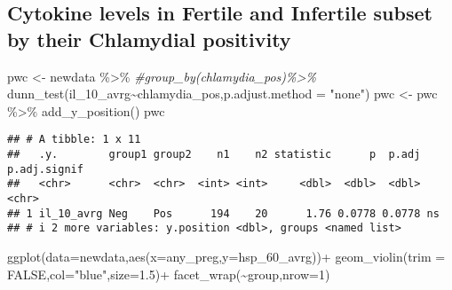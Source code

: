 \documentclass[
]{article}
\newenvironment{Shaded}{\begin{snugshade}}{\end{snugshade}}
\newcommand{\AttributeTok}[1]{\textcolor[rgb]{0.77,0.63,0.00}{#1}}
\newcommand{\CommentTok}[1]{\textcolor[rgb]{0.56,0.35,0.01}{\textit{#1}}}
\newcommand{\ConstantTok}[1]{\textcolor[rgb]{0.00,0.00,0.00}{#1}}
\newcommand{\DecValTok}[1]{\textcolor[rgb]{0.00,0.00,0.81}{#1}}
\newcommand{\FloatTok}[1]{\textcolor[rgb]{0.00,0.00,0.81}{#1}}
\newcommand{\FunctionTok}[1]{\textcolor[rgb]{0.00,0.00,0.00}{#1}}
\newcommand{\NormalTok}[1]{#1}
\newcommand{\OtherTok}[1]{\textcolor[rgb]{0.56,0.35,0.01}{#1}}
\newcommand{\SpecialCharTok}[1]{\textcolor[rgb]{0.00,0.00,0.00}{#1}}
\newcommand{\StringTok}[1]{\textcolor[rgb]{0.31,0.60,0.02}{#1}}
\begin{document}
\hypertarget{cytokine-levels-in-fertile-and-infertile-subset-by-their-chlamydial-positivity}{%
\subsection{\texorpdfstring{\textbf{Cytokine levels in Fertile and
Infertile subset by their Chlamydial
positivity}}{Cytokine levels in Fertile and Infertile subset by their Chlamydial positivity}}\label{cytokine-levels-in-fertile-and-infertile-subset-by-their-chlamydial-positivity}}

\begin{Shaded}
\begin{Highlighting}[]
\NormalTok{pwc }\OtherTok{\textless{}{-}}\NormalTok{ newdata }\SpecialCharTok{\%\textgreater{}\%}
  \CommentTok{\#group\_by(chlamydia\_pos)\%\textgreater{}\%}
  \FunctionTok{dunn\_test}\NormalTok{(il\_10\_avrg}\SpecialCharTok{\textasciitilde{}}\NormalTok{chlamydia\_pos,}\AttributeTok{p.adjust.method =} \StringTok{"none"}\NormalTok{)}
\NormalTok{pwc }\OtherTok{\textless{}{-}}\NormalTok{ pwc }\SpecialCharTok{\%\textgreater{}\%} \FunctionTok{add\_y\_position}\NormalTok{()}
\NormalTok{pwc}
\end{Highlighting}
\end{Shaded}

\begin{verbatim}
## # A tibble: 1 x 11
##   .y.        group1 group2    n1    n2 statistic      p  p.adj p.adj.signif
##   <chr>      <chr>  <chr>  <int> <int>     <dbl>  <dbl>  <dbl> <chr>       
## 1 il_10_avrg Neg    Pos      194    20      1.76 0.0778 0.0778 ns          
## # i 2 more variables: y.position <dbl>, groups <named list>
\end{verbatim}

\begin{Shaded}
\begin{Highlighting}[]
\FunctionTok{ggplot}\NormalTok{(}\AttributeTok{data=}\NormalTok{newdata,}\FunctionTok{aes}\NormalTok{(}\AttributeTok{x=}\NormalTok{any\_preg,}\AttributeTok{y=}\NormalTok{hsp\_60\_avrg))}\SpecialCharTok{+}
  \FunctionTok{geom\_violin}\NormalTok{(}\AttributeTok{trim =} \ConstantTok{FALSE}\NormalTok{,}\AttributeTok{col=}\StringTok{"blue"}\NormalTok{,}\AttributeTok{size=}\FloatTok{1.5}\NormalTok{)}\SpecialCharTok{+}
  \FunctionTok{facet\_wrap}\NormalTok{(}\SpecialCharTok{\textasciitilde{}}\NormalTok{group,}\AttributeTok{nrow=}\DecValTok{1}\NormalTok{)}
\end{Highlighting}
\end{Shaded}
\end{document}
